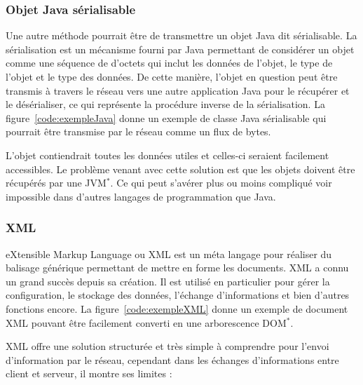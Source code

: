 \subsubsection{Objet Java s\'erialisable}

Une autre m\'ethode pourrait \^etre de transmettre un objet Java dit s\'erialisable.
La s\'erialisation est un m\'ecanisme fourni par Java permettant de consid\'erer un objet comme une s\'equence de d'octets qui inclut les donn\'ees de l'objet, le type de l'objet et le type des donn\'ees.
De cette mani\`ere, l'objet en question peut \^etre transmis \`a travers le r\'eseau vers une autre application Java pour le r\'ecup\'erer et le d\'es\'erialiser, ce qui repr\'esente la proc\'edure inverse de la s\'erialisation.
La figure~\ref{code:exempleJava} donne un exemple de classe Java s\'erialisable qui pourrait \^etre transmise par le r\'eseau comme un flux de bytes.

\vspace{0.20cm}


\label{code:exempleJava}

L'objet contiendrait toutes les donn\'ees utiles et celles-ci seraient facilement accessibles.
Le probl\`eme venant avec cette solution est que les objets doivent \^etre r\'ecup\'er\'es par une JVM$^*$.
Ce qui peut s'av\'erer plus ou moins compliqu\'e voir impossible dans d'autres langages de programmation que Java.

\subsubsection{XML}

eXtensible Markup Language ou XML est un m\'eta langage pour r\'ealiser du balisage g\'en\'erique permettant de mettre en forme les documents. XML a connu un grand succ\`es depuis sa cr\'eation.
Il est utilis\'e en particulier pour g\'erer la configuration, le stockage des donn\'ees, l'\'echange d'informations et bien d'autres fonctions encore.
La figure~\ref{code:exempleXML} donne un exemple de document XML pouvant \^etre facilement converti en une arborescence DOM$^*$.

\vspace{0.20cm}


\label{code:exempleXML}

XML offre une solution structur\'ee et tr\`es simple \`a comprendre pour l'envoi d'information par le r\'eseau, cependant dans les \'echanges d'informations entre client et serveur, il montre ses limites :

